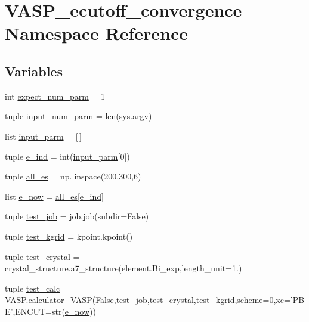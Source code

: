 \hypertarget{namespace_v_a_s_p__ecutoff__convergence}{\section{V\+A\+S\+P\+\_\+ecutoff\+\_\+convergence Namespace Reference}
\label{namespace_v_a_s_p__ecutoff__convergence}
}
\subsection*{Variables}
\begin{DoxyCompactItemize}
\item 
int \hyperlink{namespace_v_a_s_p__ecutoff__convergence_a9965ad85793a2cde84cd51cabb5d5a35}{expect\+\_\+num\+\_\+parm} = 1
\item 
tuple \hyperlink{namespace_v_a_s_p__ecutoff__convergence_a5370b53a459335c6ec045ad0bb6bd759}{input\+\_\+num\+\_\+parm} = len(sys.\+argv)
\item 
list \hyperlink{namespace_v_a_s_p__ecutoff__convergence_a160a76862b3ae963040ff4c3d81d4f19}{input\+\_\+parm} = \mbox{[}$\,$\mbox{]}
\item 
tuple \hyperlink{namespace_v_a_s_p__ecutoff__convergence_a6c83348a585fff1e90f3cd6281c53322}{e\+\_\+ind} = int(\hyperlink{namespace_v_a_s_p__ecutoff__convergence_a160a76862b3ae963040ff4c3d81d4f19}{input\+\_\+parm}\mbox{[}0\mbox{]})
\item 
tuple \hyperlink{namespace_v_a_s_p__ecutoff__convergence_aeeae920ec4c0b378e7329b859edcbadc}{all\+\_\+es} = np.\+linspace(200,300,6)
\item 
list \hyperlink{namespace_v_a_s_p__ecutoff__convergence_adae3249c19422f60c853d15e432a0e40}{e\+\_\+now} = \hyperlink{namespace_v_a_s_p__ecutoff__convergence_aeeae920ec4c0b378e7329b859edcbadc}{all\+\_\+es}\mbox{[}\hyperlink{namespace_v_a_s_p__ecutoff__convergence_a6c83348a585fff1e90f3cd6281c53322}{e\+\_\+ind}\mbox{]}
\item 
tuple \hyperlink{namespace_v_a_s_p__ecutoff__convergence_a15e578365428bb2b848493c44550d026}{test\+\_\+job} = job.\+job(subdir=False)
\item 
tuple \hyperlink{namespace_v_a_s_p__ecutoff__convergence_a8a9d3a7f5f06ab4f838741c9467dd4f4}{test\+\_\+kgrid} = kpoint.\+kpoint()
\item 
tuple \hyperlink{namespace_v_a_s_p__ecutoff__convergence_a92359c3b2568f133a889e58007978055}{test\+\_\+crystal} = crystal\+\_\+structure.\+a7\+\_\+structure(element.\+Bi\+\_\+exp,length\+\_\+unit=1.)
\item 
tuple \hyperlink{namespace_v_a_s_p__ecutoff__convergence_a0932f8fc31cc2292875f4747efdb6266}{test\+\_\+calc} = V\+A\+S\+P.\+calculator\+\_\+\+V\+A\+S\+P(False,\hyperlink{namespace_v_a_s_p__ecutoff__convergence_a15e578365428bb2b848493c44550d026}{test\+\_\+job},\hyperlink{namespace_v_a_s_p__ecutoff__convergence_a92359c3b2568f133a889e58007978055}{test\+\_\+crystal},\hyperlink{namespace_v_a_s_p__ecutoff__convergence_a8a9d3a7f5f06ab4f838741c9467dd4f4}{test\+\_\+kgrid},scheme=0,xc='P\+B\+E',E\+N\+C\+U\+T=str(\hyperlink{namespace_v_a_s_p__ecutoff__convergence_adae3249c19422f60c853d15e432a0e40}{e\+\_\+now}))
\end{DoxyCompactItemize}



